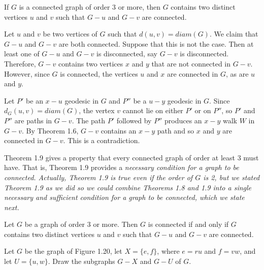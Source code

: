 \begin{thm}
If $G$ is a connected graph of order 3 or more, then $G$ contains two distinct vertices $u$ and $v$ such that $G-u$ and $G-v$ are connected.
\end{thm}

\begin{pf}
Let $u$ and $v$ be two vertices of $G$ such that $d(u,v) = diam(G)$. We claim that $G-u$ and $G-v$ are both connected. Suppose that this is not the case. Then at least one of $G-u$ and $G-v$ is disconnected, say $G-v$ is disconnected. Therefore, $G-v$ contains two vertices $x$ and $y$ that are not connected in $G-v$. However, since $G$ is connected, the vertices $u$ and $x$ are connected in $G$, as are $u$ and $y$.

Let $P'$ be an $x-u$ geodesic in $G$ and $P''$ be a $u-y$ geodesic in $G$. Since $d_{G}(u,v) = diam(G)$, the vertex $v$ cannot lie on either $P'$ or on $P''$, so $P'$ and $P''$ are paths in $G-v$. The path $P'$ followed by $P''$ produces an $x-y$ walk $W$ in $G-v$. By Theorem 1.6, $G-v$ contains an $x-y$ path and so $x$ and $y$ are connected in $G-v$. This is a contradiction.
\end{pf}

Theorem 1.9 gives a property that every connected graph of order at least 3 must have. That is, Theorem 1.9 provides a \it{necessary condition} for a graph to be connected. Actually, Theorem 1.9 is true even if the order of $G$ is 2, but we stated Theorem 1.9 as we did so we could combine Theorems 1.8 and 1.9 into a single \it{necessary and sufficient condition} for a graph to be connected, which we state next.

\begin{thm}
Let $G$ be a graph of order 3 or more. Then $G$ is connected if and only if $G$ contains two distinct vertices $u$ and $v$ such that $G-u$ and $G-v$ are connected.
\end{thm}

\begin{exers}\end{exers}

\begin{exer}
Let $G$ be the graph of Figure 1.20, let $X = \{e,f\}$, where $e = ru$ and $f = vw$, and let $U = \{u,w\}$. Draw the subgraphs $G-X$ and $G-U$ of $G$.


\end{exer}

